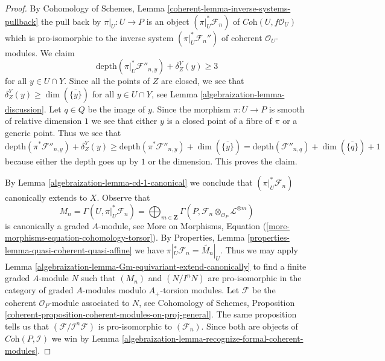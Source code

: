 \begin{proof}
\medskip\noindent
By Cohomology of Schemes, Lemma \ref{coherent-lemma-inverse-systems-pullback}
the pull back by $\pi|_U : U \to P$ is an object
$(\pi|_U^*\mathcal{F}_n)$ of $\textit{Coh}(U, f\mathcal{O}_U)$
which is pro-isomorphic to the inverse system
$(\pi|_U^*\mathcal{F}_n'')$ of coherent $\mathcal{O}_U$-modules.
We claim
$$
\text{depth}(\pi|_U^*\mathcal{F}''_{n, y}) + \delta_Z^Y(y) \geq 3
$$
for all $y \in U \cap Y$. Since all the points of $Z$ are closed, we
see that $\delta_Z^Y(y) \geq \dim(\overline{\{y\}})$ for all
$y \in U \cap Y$, see Lemma \ref{algebraization-lemma-discussion}.
Let $q \in Q$ be the image of $y$. Since the morphism $\pi : U \to P$ is
smooth of relative dimension $1$ we see that either $y$ is a closed point
of a fibre of $\pi$ or a generic point.
Thus we see that
$$
\text{depth}(\pi^*\mathcal{F}''_{n, y}) + \delta_Z^Y(y)
\geq
\text{depth}(\pi^*\mathcal{F}''_{n, y}) + \dim(\overline{\{y\}}) =
\text{depth}(\mathcal{F}''_{n, q}) + \dim(\overline{\{q\}}) + 1
$$
because either the depth goes up by $1$ or the dimension.
This proves the claim.

\medskip\noindent
By Lemma \ref{algebraization-lemma-cd-1-canonical} we conclude that
$(\pi|_U^*\mathcal{F}_n)$ canonically extends to $X$.
Observe that
$$
M_n = \Gamma(U, \pi|_U^*\mathcal{F}_n) =
\bigoplus\nolimits_{m \in \mathbf{Z}}
\Gamma(P, \mathcal{F}_n \otimes_{\mathcal{O}_P} \mathcal{L}^{\otimes m})
$$
is canonically a graded $A$-module, see
More on Morphisms, Equation (\ref{more-morphisms-equation-cohomology-torsor}).
By Properties, Lemma \ref{properties-lemma-quasi-coherent-quasi-affine}
we have $\pi|_U^*\mathcal{F}_n = \widetilde{M_n}|_U$.
Thus we may apply Lemma \ref{algebraization-lemma-Gm-equivariant-extend-canonically}
to find a finite graded $A$-module $N$ such that
$(M_n)$ and $(N/I^nN)$ are pro-isomorphic in the category
of graded $A$-modules modulo $A_+$-torsion modules.
Let $\mathcal{F}$ be the coherent $\mathcal{O}_P$-module
associated to $N$, see
Cohomology of Schemes, Proposition
\ref{coherent-proposition-coherent-modules-on-proj-general}.
The same proposition tells us that $(\mathcal{F}/\mathcal{I}^n\mathcal{F})$
is pro-isomorphic to $(\mathcal{F}_n)$.
Since both are objects of $\textit{Coh}(P, \mathcal{I})$
we win by Lemma \ref{algebraization-lemma-recognize-formal-coherent-modules}.
\end{proof}

